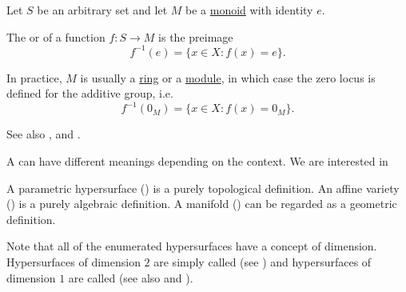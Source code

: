 \begin{definition}\label{def:zero_locus}
  Let \( S \) be an arbitrary set and let \( M \) be a \hyperref[def:monoid]{monoid} with identity \( e \).

  The  or  of a function \( f: S \to M \) is the preimage
  \begin{equation*}
    f^{-1}(e) = \{ x \in X \colon f(x) = e \}.
  \end{equation*}

  In practice, \( M \) is usually a \hyperref[def:ring]{ring} or a \hyperref[def:module]{module}, in which case the zero locus is defined for the additive group, i.e.
  \begin{equation*}
    f^{-1}(0_M) = \{ x \in X \colon f(x) = 0_M \}.
  \end{equation*}

  See also ,  and .
\end{definition}

\begin{definition}\label{def:hypersurface}
  A  can have different meanings depending on the context. We are interested in

  \begin{thmenum}
     A parametric hypersurface () is a purely topological definition.
     An affine variety () is a purely algebraic definition.
     A manifold () can be regarded as a geometric definition.
  \end{thmenum}

  Note that all of the enumerated hypersurfaces have a concept of dimension. Hypersurfaces of dimension \( 2 \) are simply called  (see ) and hypersurfaces of dimension \( 1 \) are called  (see also  and ).
\end{definition}

